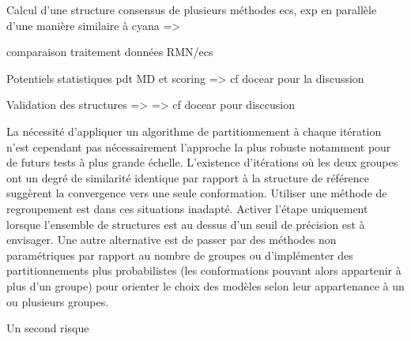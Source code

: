 \begin{todolist}
\item Calcul d'une structure consensus de plusieurs méthodes ecs, exp en parallèle d'une manière similaire à cyana => \citep{Buchner2015}
\item comparaison traitement données RMN/ecs 
\item Potentiels statistiques pdt MD et scoring => cf docear pour la discussion 

\item Validation des structures => \citep{Montelione2013} => cf docear pour disccusion
\end{todolist}
La nécessité d'appliquer un algorithme de partitionnement à chaque itération n'est cependant pas nécessairement l'approche la plus robuste notamment pour de futurs tests à plus grande échelle. L'existence d'itérations où les deux groupes ont un degré de similarité identique par rapport à la structure de référence suggèrent la convergence vers une seule conformation. Utiliser une méthode de regroupement est dans ces situations inadapté. Activer l'étape uniquement lorsque l'ensemble de structures est au dessus d'un seuil de précision est à envisager. Une autre alternative est de passer par des méthodes non paramétriques par rapport au nombre de groupes ou d'implémenter des partitionnements plus probabilistes (les conformations pouvant alors appartenir à plus d'un groupe) pour orienter le choix des modèles selon leur appartenance à un ou plusieurs groupes. 

Un second risque 

